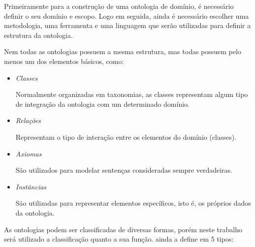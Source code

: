 Primeiramente para a construção de uma ontologia de domínio, é necessário definir
o seu domínio e escopo. Logo em seguida, ainda é necessário escolher uma 
metodologia, uma ferramenta e uma linguagem que serão utilizadas para definir a 
estrutura da ontologia. 

Nem todas as ontologias possuem a mesma estrutura, mas todas possuem pelo menos 
um dos elementos básicos, como:

\begin{itemize}
    \item \textit{Classes}
    
    Normalmente organizadas em taxonomias, as classes representam algum tipo de
    integração da ontologia com um determinado domínio.
    
    \item \textit{Relações}
    
    Representam o tipo de interação entre os elementos do domínio (classes).
    
    \item \textit{Axiomas}
    
    São utilizados para modelar sentenças consideradas sempre verdadeiras.
    
    \item \textit{Instâncias}
    
    São utilizadas para representar elementos específicos, isto é, os próprios 
    dados da ontologia.
\end{itemize}


As ontologias podem ser classificadas de diversas formas, porém neste trabalho
será utilizado a classificação quanto a sua função. \cite{guizzardidesenvolvimento} 
ainda a define em 5 tipos:

